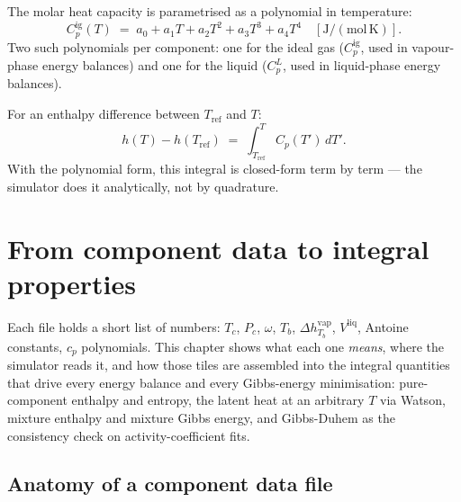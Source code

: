 \documentclass[11pt,a4paper]{article}
\begin{document}
The molar heat capacity is parametrised as a polynomial in temperature:
\begin{equation}
   C_p^{\mathrm{ig}}(T) \;=\; a_0 + a_1 T + a_2 T^2 + a_3 T^3 + a_4 T^4
   \quad[\mathrm{J/(mol\,K)}].
\end{equation}
Two such polynomials per component: one for the ideal gas
($C_p^{\mathrm{ig}}$, used in vapour-phase energy balances) and one for
the liquid ($C_p^L$, used in liquid-phase energy balances).

For an enthalpy difference between $T_{\mathrm{ref}}$ and $T$:
\begin{equation}
   h(T) - h(T_{\mathrm{ref}}) \;=\; \int_{T_{\mathrm{ref}}}^{T} C_p(T')\, dT'.
\end{equation}
With the polynomial form, this integral is closed-form term by term ---
the simulator does it analytically, not by quadrature.

\section{From component data to integral properties}\label{ch:integrals}

\begin{whatyoulllearn}
Each  file holds a short list of
numbers: $T_c$, $P_c$, $\omega$, $T_b$, $\Delta h^{\mathrm{vap}}_{T_b}$,
$V^{\mathrm{liq}}$, Antoine constants, $c_p$ polynomials.  This chapter
shows what each one \emph{means}, where the simulator reads it, and
how those tiles are assembled into the integral quantities that drive
every energy balance and every Gibbs-energy minimisation:
pure-component enthalpy and entropy, the latent heat at an arbitrary
$T$ via Watson, mixture enthalpy and mixture Gibbs energy, and
Gibbs-Duhem as the consistency check on activity-coefficient fits.
\end{whatyoulllearn}

\subsection{Anatomy of a component data file}\label{ch:integrals-anatomy}
\end{document}

